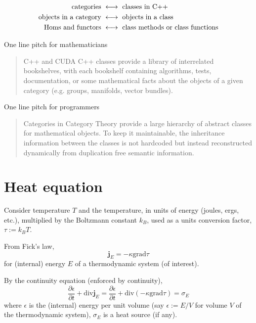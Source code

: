 \documentclass[10pt, landscape]{amsart}
\begin{document}
\pagebreak
{\LARGE
\[
\begin{aligned}
  \text{ categories } & \longleftrightarrow  \text{ classes in C++ }  \\
  \text{ objects in a category } & \longleftrightarrow \text{ objects in a class } \\
  \text{ \text{Hom}s and functors } & \longleftrightarrow \text{ class methods or class functions }
\end{aligned}
\]

}

\pagebreak
{\LARGE
  One line pitch for mathematicians \\

\begin{quote} C++ and CUDA C++ classes provide a library of interrelated bookshelves, with each bookshelf containing algorithms,  tests, documentation, or some mathematical facts about the objects of a given category (e.g. groups, manifolds, vector bundles). \end{quote} 

One line pitch for programmers  \\

\begin{quote} Categories in Category Theory provide a large hierarchy of abstract classes for mathematical objects. To keep it maintainable, the inheritance information between the classes is not hardcoded but instead reconstructed dynamically from duplication free semantic information. \end{quote} 


}
\pagebreak


\section{Heat equation}

Consider temperature $T$ and the temperature, in units of energy (joules, ergs, etc.), multiplied by the Boltzmann constant $k_B$, used as a units conversion factor, $\tau := k_BT$.

From Fick's law,
\[
\mathbf{j}_E = -\kappa \text{grad} \tau
\]
for (internal) energy $E$ of a thermodynamic system (of interest).

By the continuity equation (enforced by continuity),
\[
\frac{ \partial \epsilon }{ \partial t} + \text{div}\mathbf{j}_E = \frac{ \partial \epsilon }{ \partial t} + \text{div}(-\kappa \text{grad}\tau ) = \sigma_E
\]
where $\epsilon$ is the (internal) energy per unit volume (say $\epsilon := E /V$ for volume $V$ of the thermodynamic system), $\sigma_E$ is a heat source (if any).
\end{document}
